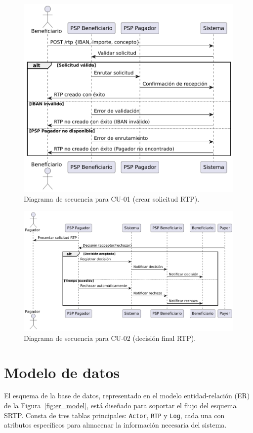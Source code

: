 \begin{figure}[htbp]
  \centering
  \includegraphics[width=.9\textwidth]{Imagenes/CU01.pdf}
  \caption{Diagrama de secuencia para CU‑01 (crear solicitud RTP).}
  \label{fig:seq_cu01}
\end{figure}

\begin{figure}[htbp]
  \centering
  \includegraphics[width=.9\textwidth]{Imagenes/CU02.pdf}
  \caption{Diagrama de secuencia para CU‑02 (decisión final RTP).}
  \label{fig:seq_cu02}
\end{figure}

\section{Modelo de datos}
\label{subsec:diseno_datos}

El esquema de la base de datos, representado en el modelo entidad-relación (ER) de la Figura~\ref{fig:er_model}, está diseñado para soportar el flujo del esquema SRTP. Consta de tres tablas principales: \texttt{Actor}, \texttt{RTP} y \texttt{Log}, cada una con atributos específicos para almacenar la información necesaria del sistema.

